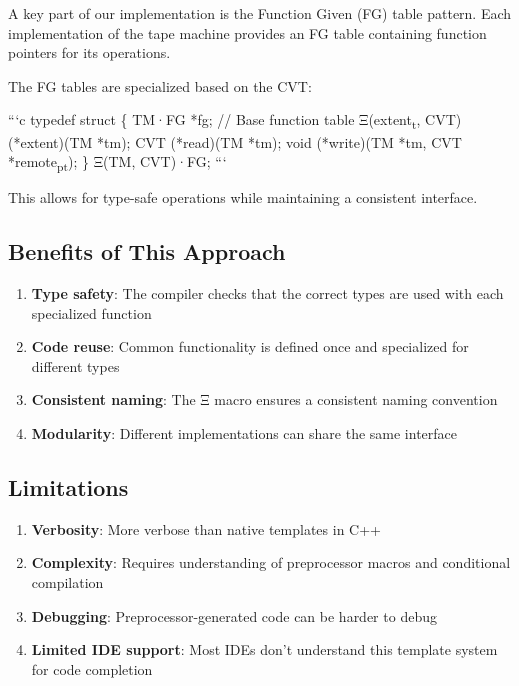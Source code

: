 \documentclass[11pt]{article}
\begin{document}
A key part of our implementation is the Function Given (FG) table pattern. Each implementation of the tape machine provides an FG table containing function pointers for its operations.

The FG tables are specialized based on the CVT:

```c
typedef struct \{
  TM·FG *fg;  // Base function table
  Ξ(extent\textsubscript{t}, CVT) (*extent)(TM *tm);
  CVT (*read)(TM *tm);
  void (*write)(TM *tm, CVT *remote\textsubscript{pt});
\} Ξ(TM, CVT)·FG;
```

This allows for type-safe operations while maintaining a consistent interface.

\subsection{Benefits of This Approach}
\label{sec:org5338608}

\begin{enumerate}
\item \textbf{\textbf{Type safety}}: The compiler checks that the correct types are used with each specialized function
\item \textbf{\textbf{Code reuse}}: Common functionality is defined once and specialized for different types
\item \textbf{\textbf{Consistent naming}}: The Ξ macro ensures a consistent naming convention
\item \textbf{\textbf{Modularity}}: Different implementations can share the same interface
\end{enumerate}

\subsection{Limitations}
\label{sec:org70b9fc6}

\begin{enumerate}
\item \textbf{\textbf{Verbosity}}: More verbose than native templates in C++
\item \textbf{\textbf{Complexity}}: Requires understanding of preprocessor macros and conditional compilation
\item \textbf{\textbf{Debugging}}: Preprocessor-generated code can be harder to debug
\item \textbf{\textbf{Limited IDE support}}: Most IDEs don't understand this template system for code completion
\end{enumerate}
\end{document}
